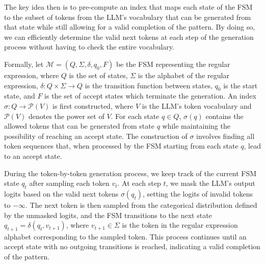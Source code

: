 \documentclass[10pt]{article} %
\begin{document}
The key idea then is to pre-compute an index that maps each state of the FSM to the subset of tokens from the LLM's vocabulary that can be generated from that state while still allowing for a valid completion of the pattern. By doing so, we can efficiently determine the valid next tokens at each step of the generation process without having to check the entire vocabulary.

Formally, let $\mathcal{M} = (Q, \Sigma, \delta, q_0, F)$ be the FSM representing the regular expression, where $Q$ is the set of states, $\Sigma$ is the alphabet of the regular expression, $\delta: Q \times \Sigma \rightarrow Q$ is the transition function between states, $q_0$ is the start state, and $F$ is the set of accept states which terminate the generation. An index $\sigma: Q \rightarrow \mathcal{P}(V)$ is first constructed, where $V$ is the LLM's token vocabulary and $\mathcal{P}(V)$ denotes the power set of $V$. For each state $q \in Q$, $\sigma(q)$ contains the allowed tokens that can be generated from state $q$ while maintaining the possibility of reaching an accept state. The construction of $\sigma$ involves finding all token sequences that, when processed by the FSM starting from each state $q$, lead to an accept state.

During the token-by-token generation process, we keep track of the current FSM state $q_t$ after sampling each token $v_t$. At each step $t$, we mask the LLM's output logits based on the valid next tokens $\sigma(q_t)$, setting the logits of invalid tokens to $-\infty$. The next token is then sampled from the categorical distribution defined by the unmasked logits, and the FSM transitions to the next state $q_{t+1} = \delta(q_t, v_{t+1})$, where $v_{t+1} \in \Sigma$ is the token in the regular expression alphabet corresponding to the sampled token. This process continues until an accept state with no outgoing transitions is reached, indicating a valid completion of the pattern.


\end{document}
